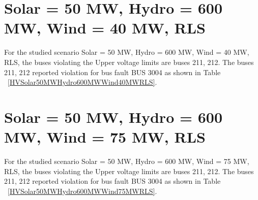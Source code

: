 \documentclass[10pt]{report}
\begin{document}
\section{Solar = 50 MW, Hydro = 600 MW, Wind = 40 MW, RLS}
For the studied scenario Solar = 50 MW, Hydro = 600 MW, Wind = 40 MW, RLS, the buses violating the Upper voltage limits are buses 211, 212.
The buses 211, 212 reported violation for bus fault BUS 3004 as shown in Table ~\ref{HVSolar50MWHydro600MWWind40MWRLS}.
\begin{table}[H]
\caption{Contingencies reporting bus voltages greater than emergency voltage of 1.1 PU for scenario Solar = 50 MW, Hydro = 600 MW, Wind = 40 MW, RLS}
\label{HVSolar50MWHydro600MWWind40MWRLS}
\centering
{}
\end{table}


\section{Solar = 50 MW, Hydro = 600 MW, Wind = 75 MW, RLS}
For the studied scenario Solar = 50 MW, Hydro = 600 MW, Wind = 75 MW, RLS, the buses violating the Upper voltage limits are buses 211, 212.
The buses 211, 212 reported violation for bus fault BUS 3004 as shown in Table ~\ref{HVSolar50MWHydro600MWWind75MWRLS}.
\begin{table}[H]
\caption{Contingencies reporting bus voltages greater than emergency voltage of 1.1 PU for scenario Solar = 50 MW, Hydro = 600 MW, Wind = 75 MW, RLS}
\label{HVSolar50MWHydro600MWWind75MWRLS}
\centering
{}
\end{table}
\end{document}
